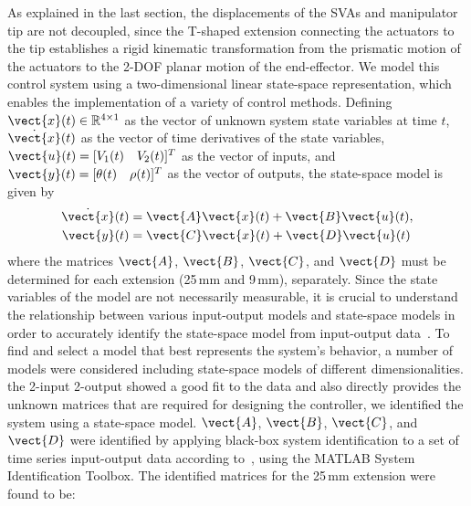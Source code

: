 As explained in the last section, the displacements of the SVAs and manipulator tip are not decoupled, since the T-shaped extension connecting the actuators to the tip establishes a rigid kinematic transformation from the prismatic motion of the actuators to the 2-DOF planar motion of the end-effector.
We model this control system using a two-dimensional linear state-space representation, which enables the implementation of a variety of control methods. Defining $\vect{x}(t) \in \mathbb{R}^{4\times1}$ as the vector of unknown system state variables at time $t$, $\dot{\vect{x}}(t)$ as the vector of time derivatives of the state variables, %
$\vect{u}(t)=[V_1(t) \quad V_2(t)]^T$ as the vector of inputs, and $\vect{y}(t)=[\theta(t) \quad \rho(t)]^T$ as the vector of outputs, the state-space model is given by
\begin{align}
\dot{\vect{x}}(t)&= \vect{A}\vect{x}(t)+\vect{B}\vect{u}(t), \nonumber\\
\vect{y}(t)&= \vect{C}\vect{x}(t)+\vect{D}\vect{u}(t)\label{eq:2Dmodel} 
\end{align}
where the matrices $\vect{A}$, $\vect{B}$, $\vect{C}$, and $\vect{D}$ must be determined for each extension (25\,mm and 9\,mm), separately. Since the state variables of the model are not necessarily measurable, it is crucial to understand the relationship between various input-output models and state-space models in order to accurately identify the state-space model from input-output data~\cite{lim1998state}. To find and select a model that best represents the system's behavior, a number of models were considered including state-space models of different dimensionalities.
the 2-input 2-output showed a good fit to the data and also directly provides the unknown matrices that are required for  designing the controller, we identified the system using a state-space model. $\vect{A}$, $\vect{B}$, $\vect{C}$, and $\vect{D}$ were identified by applying black-box system identification to a set of time series input-output data according to~\cite{ljung2001}, using the MATLAB System Identification Toolbox. The identified matrices for the 25\,mm extension were found to be: 

